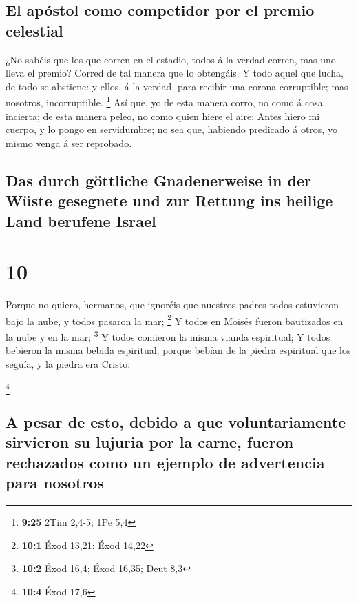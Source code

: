 \hypertarget{el-apuxf3stol-como-competidor-por-el-premio-celestial}{%
\subsection{El apóstol como competidor por el premio
celestial}\label{el-apuxf3stol-como-competidor-por-el-premio-celestial}}

 ¿No sabéis que los que corren en el estadio, todos á la
verdad corren, mas uno lleva el premio? Corred de tal manera que lo
obtengáis.  Y todo aquel que lucha, de todo se abstiene:
y ellos, á la verdad, para recibir una corona corruptible; mas nosotros,
incorruptible. \footnote{\textbf{9:25} 2Tim 2,4-5; 1Pe 5,4}
 Así que, yo de esta manera corro, no como á cosa
incierta; de esta manera peleo, no como quien hiere el aire:
 Antes hiero mi cuerpo, y lo pongo en servidumbre; no sea
que, habiendo predicado á otros, yo mismo venga á ser reprobado.

\hypertarget{das-durch-guxf6ttliche-gnadenerweise-in-der-wuxfcste-gesegnete-und-zur-rettung-ins-heilige-land-berufene-israel}{%
\subsection{Das durch göttliche Gnadenerweise in der Wüste gesegnete und
zur Rettung ins heilige Land berufene
Israel}\label{das-durch-guxf6ttliche-gnadenerweise-in-der-wuxfcste-gesegnete-und-zur-rettung-ins-heilige-land-berufene-israel}}

\hypertarget{section-9}{%
\section{10}\label{section-9}}

 Porque no quiero, hermanos, que ignoréis que nuestros
padres todos estuvieron bajo la nube, y todos pasaron la mar;
\footnote{\textbf{10:1} Éxod 13,21; Éxod 14,22}  Y todos
en Moisés fueron bautizados en la nube y en la mar; \footnote{\textbf{10:2}
  Éxod 16,4; Éxod 16,35; Deut 8,3}  Y todos comieron la
misma vianda espiritual;  Y todos bebieron la misma bebida
espiritual; porque bebían de la piedra espiritual que los seguía, y la
piedra era Cristo:

\footnote{\textbf{10:4} Éxod 17,6}

\hypertarget{a-pesar-de-esto-debido-a-que-voluntariamente-sirvieron-su-lujuria-por-la-carne-fueron-rechazados-como-un-ejemplo-de-advertencia-para-nosotros}{%
\subsection{A pesar de esto, debido a que voluntariamente sirvieron su
lujuria por la carne, fueron rechazados como un ejemplo de advertencia
para
nosotros}\label{a-pesar-de-esto-debido-a-que-voluntariamente-sirvieron-su-lujuria-por-la-carne-fueron-rechazados-como-un-ejemplo-de-advertencia-para-nosotros}}

